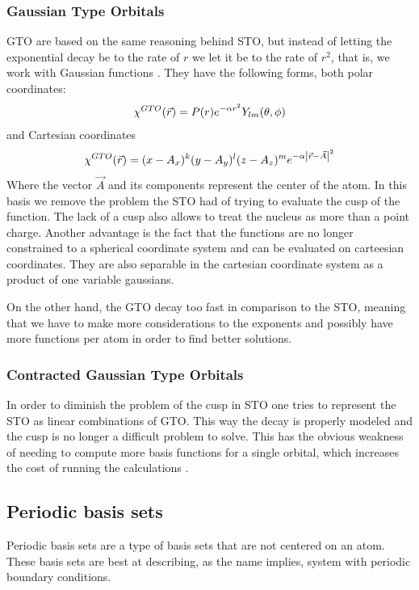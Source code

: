 \documentclass[../master_thesis.tex]{subfiles}
\begin{document}
\subsubsection{Gaussian Type Orbitals}
\ac{GTO} are based on the same reasoning behind \ac{STO}, but instead of letting
the exponential decay be to the rate of  $r$ we let it be to the rate of $r^2$,
that is, we work with Gaussian functions \cite{ESQCB1P1}.
They have the following
forms, both polar coordinates:
\begin{equation}
  \chi^{GTO}(\vec{r}) = P(r)e^{-\alpha r^2}Y_{lm}(\theta, \phi)
\end{equation}
and Cartesian coordinates
\begin{equation}
\chi^{GTO}(\vec{r}) = (x - A_x)^k(y - A_y)^l(z - A_z)^me^{-\alpha\abs{\vec{r} - \vec{A}}^2}
\end{equation}
Where the vector $\vec{A}$ and its components represent the center of the atom.
In this basis we remove the problem the \ac{STO} had of trying to evaluate the
cusp of the function. The lack of a cusp also allows to treat the nucleus as
more than a point charge. Another advantage is the fact that the functions are no
longer constrained to a spherical coordinate system and can be evaluated on carteesian
coordinates. They are also separable in the cartesian coordinate system as a product of
one variable gaussians.

On the other hand, the \ac{GTO} decay too fast in comparison to the \ac{STO},
meaning that we have to make more considerations to the exponents and possibly have more
functions per atom in order to find better solutions.
\subsubsection{Contracted Gaussian Type Orbitals}
In order to diminish the problem of the cusp in \ac{STO} one tries to represent the
\ac{STO} as linear combinations of \ac{GTO}. This way the decay is properly modeled and the
cusp is no longer a difficult problem to solve. This has the obvious weakness of needing
to compute more basis functions for a single orbital, which increases the cost of running
the calculations \cite{Cramer:2004}. %

\subsection{Periodic basis sets}
Periodic basis sets are a type of basis sets that are not centered on an atom.
These basis sets are best at describing, as the name implies, system with periodic
boundary conditions.
\end{document}
